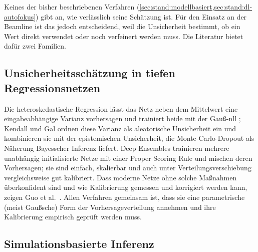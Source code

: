 Keines der bisher beschriebenen Verfahren
(\cref{sec:stand:modellbasiert,sec:stand:dl-autofokus}) gibt an, wie
verlässlich seine Schätzung ist. Für
den Einsatz an der Beamline ist das jedoch entscheidend, weil die
Unsicherheit bestimmt, ob ein Wert direkt verwendet oder noch verfeinert
werden muss. Die Literatur bietet dafür zwei Familien.

\subsection{Unsicherheitsschätzung in tiefen Regressionsnetzen}

Die heteroskedastische Regression lässt das Netz neben dem Mittelwert eine
eingabeabhängige Varianz vorhersagen und trainiert beide mit der
Gauß-\ac{nll} \cite{nix1994estimating}; Kendall und Gal
\cite{kendall2017uncertainties} ordnen diese Varianz als aleatorische Unsicherheit ein und kombinieren sie
mit der epistemischen Unsicherheit, die Monte-Carlo-Dropout
\cite{gal2016dropout} als Näherung Bayesscher Inferenz liefert. Deep
Ensembles \cite{lakshminarayanan2017ensembles} trainieren mehrere
unabhängig initialisierte Netze mit einer Proper Scoring Rule und mischen
deren Vorhersagen; sie sind einfach, skalierbar und auch unter
Verteilungsverschiebung vergleichsweise gut kalibriert. Dass moderne Netze
ohne solche Maßnahmen überkonfident sind und wie Kalibrierung gemessen und
korrigiert werden kann, zeigen Guo et al.\ \cite{guo2017calibration}. Allen Verfahren
gemeinsam ist, dass sie eine parametrische (meist Gaußsche) Form der
Vorhersageverteilung annehmen und ihre Kalibrierung empirisch geprüft werden
muss.

\subsection{Simulationsbasierte Inferenz}

